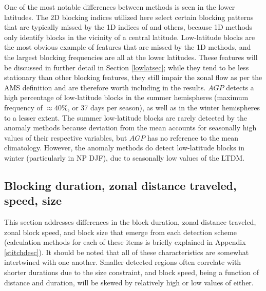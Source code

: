 \documentclass[smallextended]{svjour3}       %
\numberwithin{equation}{section}
\begin{document}
One of the most notable differences between methods is seen in the lower latitudes. The 2D blocking indices utilized here select certain blocking patterns that are typically missed by the 1D indices of \cite{tibaldi_operational_1990} and others, because  1D methods only identify blocks in the vicinity of a central latitude. Low-latitude blocks are the most obvious example of features that are missed by the 1D methods, and the largest blocking frequencies are all at the lower latitudes. These features will be discussed in further detail in Section \ref{lowlatsec}; while they tend to be less stationary than other blocking features, they still impair the zonal flow as per the AMS definition and are therefore worth including in the results. $AGP$ detects a high percentage of low-latitude blocks in the summer hemispheres (maximum frequency of $\approx 40\%$, or 37 days per season), as well as in the winter hemispheres to a lesser extent. The summer low-latitude blocks are rarely detected by the anomaly methods because deviation from the mean accounts for seasonally high values of their respective variables, but $AGP$ has no reference to the mean climatology. However, the anomaly methods do detect low-latitude blocks in winter (particularly in NP DJF), due to seasonally low values of the LTDM.


\subsection{Blocking duration, zonal distance traveled, speed, size}\label{blockingmetrics}


This section addresses differences in the block duration, zonal distance traveled, zonal block speed, and block size that emerge from each detection scheme (calculation methods for each of these items is briefly explained in Appendix \ref{stitchdesc}).  It should be noted that all of these characteristics are somewhat intertwined with one another. Smaller detected regions often correlate with shorter durations due to the size constraint, and block speed, being a function of distance and duration, will be skewed by relatively high or low values of either. 
\end{document}
